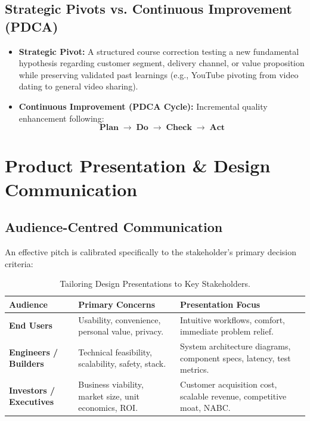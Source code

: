 \subsection{Strategic Pivots vs. Continuous Improvement (PDCA)}
\begin{itemize}[leftmargin=1.2em, itemsep=3pt]
    \item \textbf{Strategic Pivot:} A structured course correction testing a new fundamental hypothesis regarding customer segment, delivery channel, or value proposition while preserving validated past learnings (e.g., YouTube pivoting from video dating to general video sharing).
    \item \textbf{Continuous Improvement (PDCA Cycle):} Incremental quality enhancement following:
    $$\textbf{Plan} \;\rightarrow\; \textbf{Do} \;\rightarrow\; \textbf{Check} \;\rightarrow\; \textbf{Act}$$
\end{itemize}

\section{Product Presentation \& Design Communication}

\subsection{Audience-Centred Communication}
An effective pitch is calibrated specifically to the stakeholder's primary decision criteria:
\begin{table}[h!]
\centering
\small
\renewcommand{\arraystretch}{1.3}
\begin{tabularx}{\linewidth}{p{3.2cm}X X}
\toprule
\textbf{Audience} & \textbf{Primary Concerns} & \textbf{Presentation Focus} \\
\midrule
\textbf{End Users} & Usability, convenience, personal value, privacy. & Intuitive workflows, comfort, immediate problem relief. \\
\textbf{Engineers / Builders} & Technical feasibility, scalability, safety, stack. & System architecture diagrams, component specs, latency, test metrics. \\
\textbf{Investors / Executives} & Business viability, market size, unit economics, ROI. & Customer acquisition cost, scalable revenue, competitive moat, NABC. \\
\bottomrule
\end{tabularx}
\caption{Tailoring Design Presentations to Key Stakeholders.}
\end{table}

